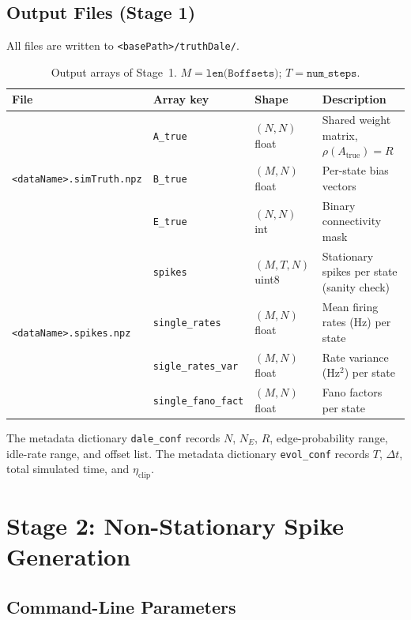 \documentclass[11pt]{article}
\begin{document}
\subsection{Output Files (Stage 1)}

All files are written to \texttt{<basePath>/truthDale/}.

\begin{table}[h]
\centering
\begin{tabular}{llll}
\toprule
File & Array key & Shape & Description \\
\midrule
\multirow{3}{*}{\texttt{<dataName>.simTruth.npz}}
  & \texttt{A\_true} & $(N,N)$ float &
      Shared weight matrix, $\rho(A_{\text{true}})=R$ \\
  & \texttt{B\_true} & $(M,N)$ float &
      Per-state bias vectors \\
  & \texttt{E\_true} & $(N,N)$ int &
      Binary connectivity mask \\
\midrule
\multirow{4}{*}{\texttt{<dataName>.spikes.npz}}
  & \texttt{spikes} & $(M,T,N)$ uint8 &
      Stationary spikes per state (sanity check) \\
  & \texttt{single\_rates} & $(M,N)$ float &
      Mean firing rates (Hz) per state \\
  & \texttt{sigle\_rates\_var} & $(M,N)$ float &
      Rate variance (Hz$^2$) per state \\
  & \texttt{single\_fano\_fact} & $(M,N)$ float &
      Fano factors per state \\
\bottomrule
\end{tabular}
\caption{Output arrays of Stage~1.
  $M = \texttt{len(Boffsets)}$; $T = \texttt{num\_steps}$.}
\label{tab:stage1_output}
\end{table}

The metadata dictionary \texttt{dale\_conf} records $N$, $N_E$, $R$,
edge-probability range, idle-rate range, and offset list.
The metadata dictionary \texttt{evol\_conf} records $T$, $\Delta t$,
total simulated time, and $\eta_{\mathrm{clip}}$.

\section{Stage 2: Non-Stationary Spike Generation}
\label{sec:nonstat_spikes}

\subsection{Command-Line Parameters}
\end{document}
